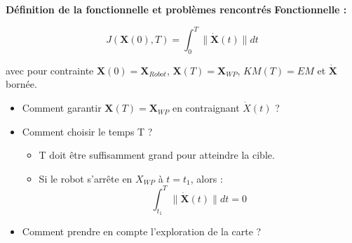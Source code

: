 \documentclass[aspectratio=169,10pt]{beamer}
\begin{document}
\begin{frame}{\textbf{Définition de la fonctionnelle et problèmes rencontrés}}
	\textbf{Fonctionnelle :}

	\begin{equation*}
		\displaystyle
		J(\mathbf{X}(0), T) = \int_{0}^{T} \| \mathbf{\dot{X}}(t) \| dt
	\end{equation*}

	avec pour contrainte $\mathbf{X}(0) = \mathbf{X}_{Robot}$, $\mathbf{X}(T) = \mathbf{X}_{WP}$, $KM(T) = EM$ et $\mathbf{\dot{X}}$ bornée.
	
	\begin{itemize}
		\item Comment garantir $\mathbf{X}(T)=\mathbf{X}_{WP}$ en contraignant $\dot{X}(t)$ ?
		\item Comment choisir le temps T ?
		\begin{itemize}
			\item T doit être suffisamment grand pour atteindre la cible.
			\item Si le robot s'arrête en $X_{WP}$ à $t = t_1$, alors :
			$$
			\displaystyle
			\int_{t_1}^{T} \| \mathbf{\dot{X}}(t) \| dt = 0
			$$
		\end{itemize}
		\item Comment prendre en compte l'exploration de la carte ?
	\end{itemize}
\end{frame}
\end{document}
